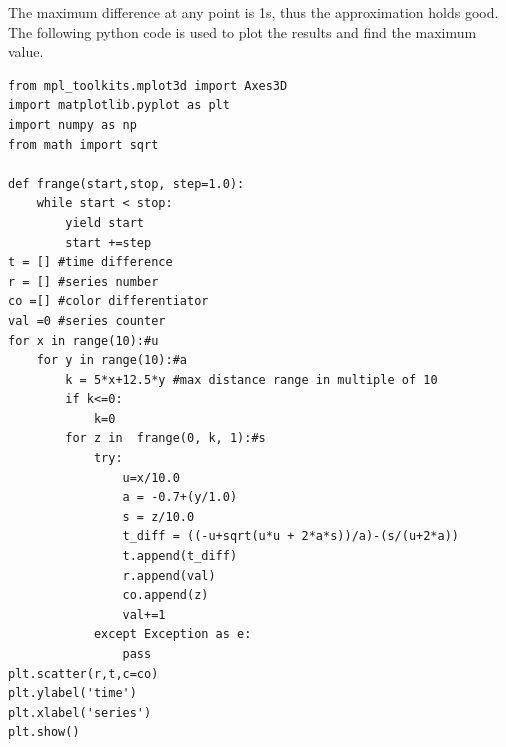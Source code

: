The maximum difference at any point is 1s, thus the approximation holds good. The following python code is used to plot the results and find the maximum value.

\newpage
\begin{lstlisting}
from mpl_toolkits.mplot3d import Axes3D
import matplotlib.pyplot as plt
import numpy as np
from math import sqrt

def frange(start,stop, step=1.0):
	while start < stop:
		yield start
		start +=step
t = [] #time difference
r = [] #series number
co =[] #color differentiator
val =0 #series counter
for x in range(10):#u
	for y in range(10):#a
		k = 5*x+12.5*y #max distance range in multiple of 10
		if k<=0:
			k=0
		for z in  frange(0, k, 1):#s
			try:
				u=x/10.0
				a = -0.7+(y/1.0)
				s = z/10.0
				t_diff = ((-u+sqrt(u*u + 2*a*s))/a)-(s/(u+2*a))
				t.append(t_diff)
				r.append(val)
				co.append(z)
				val+=1
			except Exception as e:
				pass
plt.scatter(r,t,c=co)
plt.ylabel('time')
plt.xlabel('series')
plt.show()


\end{lstlisting}
